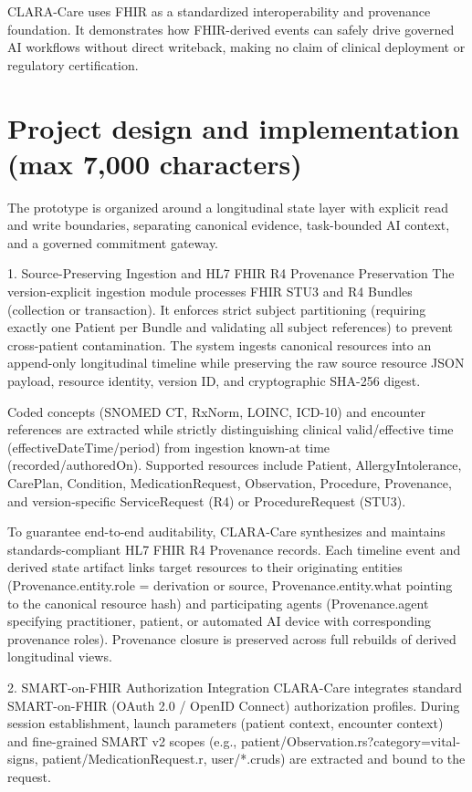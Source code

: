 \documentclass[10pt,letterpaper]{article}
\begin{document}
CLARA-Care uses FHIR as a standardized interoperability and provenance foundation. It demonstrates how FHIR-derived events can safely drive governed AI workflows without direct writeback, making no claim of clinical deployment or regulatory certification.

\section{Project design and implementation (max 7,000 characters)}
The prototype is organized around a longitudinal state layer with explicit read and write boundaries, separating canonical evidence, task-bounded AI context, and a governed commitment gateway.

1. Source-Preserving Ingestion and HL7 FHIR R4 Provenance Preservation
The version-explicit ingestion module processes FHIR STU3 and R4 Bundles (collection or transaction). It enforces strict subject partitioning (requiring exactly one Patient per Bundle and validating all subject references) to prevent cross-patient contamination. The system ingests canonical resources into an append-only longitudinal timeline while preserving the raw source resource JSON payload, resource identity, version ID, and cryptographic SHA-256 digest.

Coded concepts (SNOMED CT, RxNorm, LOINC, ICD-10) and encounter references are extracted while strictly distinguishing clinical valid/effective time (effectiveDateTime/period) from ingestion known-at time (recorded/authoredOn). Supported resources include Patient, AllergyIntolerance, CarePlan, Condition, MedicationRequest, Observation, Procedure, Provenance, and version-specific ServiceRequest (R4) or ProcedureRequest (STU3).

To guarantee end-to-end auditability, CLARA-Care synthesizes and maintains standards-compliant HL7 FHIR R4 Provenance records. Each timeline event and derived state artifact links target resources to their originating entities (Provenance.entity.role = derivation or source, Provenance.entity.what pointing to the canonical resource hash) and participating agents (Provenance.agent specifying practitioner, patient, or automated AI device with corresponding provenance roles). Provenance closure is preserved across full rebuilds of derived longitudinal views.

2. SMART-on-FHIR Authorization Integration
CLARA-Care integrates standard SMART-on-FHIR (OAuth 2.0 / OpenID Connect) authorization profiles. During session establishment, launch parameters (patient context, encounter context) and fine-grained SMART v2 scopes (e.g., patient/Observation.rs?category=vital-signs, patient/MedicationRequest.r, user/*.cruds) are extracted and bound to the request.
\end{document}
